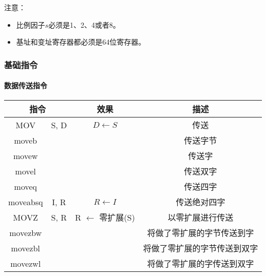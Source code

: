 注意：
\begin{itemize}
    \item 比例因子$s$必须是1、2、4或者8。
    \item 基址和变址寄存器都必须是64位寄存器。
\end{itemize}

\subsubsection{基础指令}
\paragraph{数据传送指令}
\begin{table}[H]
    \centering
    \begin{tabular}{|c c|c|c|}
        \hline
        \multicolumn{2}{|c|}{\textbf{指令}} & \textbf{效果} & \textbf{描述}                                       \\
        \hline
        MOV                               & S, D        & $D \leftarrow S$               & 传送               \\
        \hline
        moveb                             &             &                                & 传送字节             \\
        movew                             &             &                                & 传送字              \\
        movel                             &             &                                & 传送双字             \\
        moveq                             &             &                                & 传送四字             \\
        moveabsq                          & I, R        & $R \leftarrow I$               & 传送绝对四字           \\
        \hline
        MOVZ                              & S, R        & R $\leftarrow$ 零扩展(S)          & 以零扩展进行传送         \\
        \hline
        movezbw                           &             &                                & 将做了零扩展的字节传送到字    \\
        movezbl                           &             &                                & 将做了零扩展的字节传送到双字   \\
        movezwl                           &             &                                & 将做了零扩展的字传送到双字    \\

\end{tabular}
\end{table}
